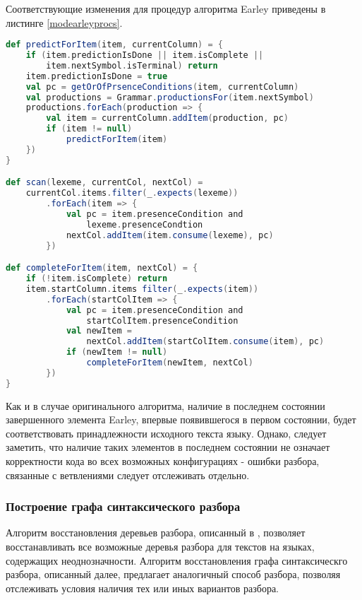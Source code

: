 Соответствующие изменения для процедур алгоритма Earley приведены в листинге \ref{modearleyprocs}.

\begin{minipage}{\linewidth}
\begin{lstlisting}[caption={Псевдокод модифицированных процедур алгоритма Earley},language=Scala,label=modearleyprocs]
def predictForItem(item, currentColumn) = {
	if (item.predictionIsDone || item.isComplete || 
		item.nextSymbol.isTerminal) return
	item.predictionIsDone = true
	val pc = getOrOfPrsenceConditions(item, currentColumn)
	val productions = Grammar.productionsFor(item.nextSymbol)
	productions.forEach(production => {
		val item = currentColumn.addItem(production, pc)
		if (item != null)
			predictForItem(item)
	})
}

def scan(lexeme, currentCol, nextCol) = 
	currentCol.items.filter(_.expects(lexeme))
		.forEach(item => {
			val pc = item.presenceCondition and
				lexeme.presenceCondtion
			nextCol.addItem(item.consume(lexeme), pc)
		})

def completeForItem(item, nextCol) = {
	if (!item.isComplete) return
	item.startColumn.items filter(_.expects(item))
		.forEach(startColItem => {
			val pc = item.presenceCondition and 
				startColItem.presenceCondition
			val newItem = 
				nextCol.addItem(startColItem.consume(item), pc)
			if (newItem != null)
				completeForItem(newItem, nextCol)		
		})
}
\end{lstlisting}
\end{minipage}

Как и в случае оригинального алгоритма, наличие в последнем состоянии завершенного элемента Earley, впервые появившегося в первом состоянии, будет соответствовать принадлежности исходного текста языку. Однако, следует заметить, что наличие таких элементов в последнем состоянии не означает корректности кода во всех возможных конфигурациях - ошибки разбора, связанные с ветвлениями следует отслеживать отдельно.

\subsubsection{Построение графа синтаксического разбора}

Алгоритм восстановления деревьев разбора, описанный в \cite{recognizertoparser}, позволяет восстанавливать все возможные деревья разбора для текстов на языках, содержащих неоднозначности. Алгоритм восстановления графа синтаксическго разбора, описанный далее, предлагает аналогичный способ разбора, позволяя отслеживать условия наличия тех или иных вариантов разбора.

